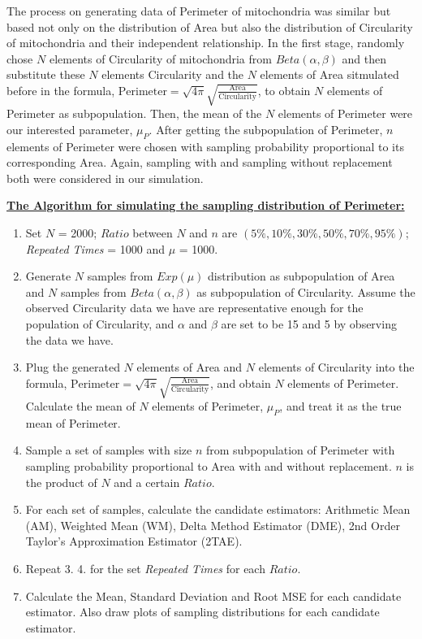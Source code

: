 \documentclass{article}\usepackage[]{graphicx}\usepackage[]{color}
\numberwithin{figure}{subsection} %
\numberwithin{table}{subsection} %
\begin{document}
\bigbreak
The process on generating data of Perimeter of mitochondria was similar but based not only on the distribution of Area but also the distribution of Circularity of mitochondria and their independent relationship. In the first stage, randomly chose $N$ elements of Circularity of mitochondria from $Beta(\alpha, \beta)$ and then substitute these $N$ elements Circularity and the $N$ elements of Area sitmulated before in the formula, $\text{Perimeter}=\sqrt{4\pi}\sqrt{\frac{\text{Area}}{\text{Circularity}}}$, to obtain $N$ elements of Perimeter as subpopulation. Then, the mean of the $N$ elements of Perimeter were our interested parameter, ${\mu}_{P}$. After getting the subpopulation of Perimeter, $n$ elements of Perimeter were chosen with sampling probability proportional to its corresponding Area. Again, sampling with and sampling without replacement both were considered in our simulation. 

\bigskip
\setlength{\parskip}{0em}
\noindent\textbf{\underline{The Algorithm for simulating the sampling distribution of Perimeter:}}

\begin{enumerate}
  \item Set $N$ = 2000; $Ratio$ between $N$ and $n$ are $\left( 5\%, 10\%, 30\%, 50\%, 70\%, 95\% \right)$; \textit{Repeated Times} = 1000 and $\mu$ = 1000. 
  \item Generate $N$ samples from $Exp(\mu)$ distribution as subpopulation of Area and $N$ samples from $Beta(\alpha, \beta)$ as subpopulation of Circularity. Assume the observed Circularity data we have are representative enough for the population of Circularity, and $\alpha$ and $\beta$ are set to be 15 and 5 by observing the data we have.  
  \item Plug the generated $N$ elements of Area and $N$ elements of Circularity into the formula, $\text{Perimeter}=\sqrt{4\pi}\sqrt{\frac{\text{Area}}{\text{Circularity}}}$, and obtain $N$ elements of Perimeter. Calculate the mean of $N$ elements of Perimeter, ${\mu}_{P}$, and treat it as the true mean of Perimeter. 
  \item Sample a set of samples with size $n$ from subpopulation of Perimeter with sampling probability proportional to Area with and without replacement. $n$ is the product of $N$ and a certain $Ratio$.
  \item For each set of samples, calculate the candidate estimators: Arithmetic Mean (AM), Weighted Mean (WM), Delta Method Estimator (DME), 2nd Order Taylor's Approximation Estimator (2TAE).
  \item Repeat 3. 4. for the set \textit{Repeated Times} for each $Ratio$. 
  \item Calculate the Mean, Standard Deviation and Root MSE for each candidate estimator. Also draw plots of sampling distributions for each candidate estimator.
\end{enumerate}
\end{document}
